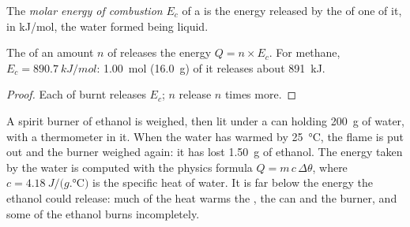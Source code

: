 \begin{definition}\label{def:g11:reaction-energy:combustion-energy}
The \emph{molar energy of combustion}
$E_c$ of a  is the energy released by the  of one
 of it, in \si{kJ/mol}, the water formed being liquid.
\end{definition}

\begin{proposition}\label{prop:g11:reaction-energy:n-moles}
The  of an amount $n$ of  releases the energy
$Q = n \times E_c$. For methane, $E_c = \qty{890.7}{kJ/mol}$: 
\qty{1.00}{mol} (\qty{16.0}{g}) of it releases about \qty{891}{kJ}.
\end{proposition}

\begin{proof}
Each  of  burnt releases $E_c$; $n$  release $n$ times
more.
\end{proof}

\begin{inthelab}
A spirit burner of ethanol is weighed, then lit under a  can holding
\qty{200}{g} of water, with a thermometer in it. When the water has
warmed by \qty{25}{\celsius}, the flame is put out and the burner
weighed again: it has lost \qty{1.50}{g} of ethanol. The energy taken by
the water is computed with the physics formula $Q = m\, c\, \Delta\theta$,
where $c = \qty{4.18}{J/(g.\celsius)}$ is the specific heat of water. It
is far below the energy the ethanol could release: much of the heat
warms the , the can and the burner, and some of the ethanol burns
incompletely.
\end{inthelab}

